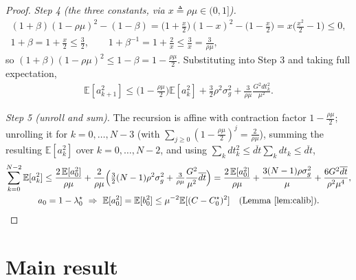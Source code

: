 \documentclass[11pt]{article}
\newcommand{\E}{\mathbb{E}}
\theoremstyle{plain}
\theoremstyle{definition}
\theoremstyle{remark}
\begin{document}
\begin{proof}
\emph{Step 4 (the three constants, via $x\triangleq\rho\mu\in(0,1]$).}
\begin{gather*}
(1+\beta)(1-\rho\mu)^2-(1-\beta)=\big(1+\tfrac x2\big)(1-x)^2-\big(1-\tfrac x2\big)=x\big(\tfrac{x^2}{2}-1\big)\le0,\\
1+\beta=1+\tfrac x2\le\tfrac32,\qquad 1+\beta^{-1}=1+\tfrac2x\le\tfrac3x=\tfrac{3}{\rho\mu},
\end{gather*}
so $(1+\beta)(1-\rho\mu)^2\le1-\beta=1-\tfrac{\rho\mu}{2}$. Substituting into Step 3 and taking full expectation,
\begin{gather*}
\E[a_{k+1}^2]\le\big(1-\tfrac{\rho\mu}{2}\big)\E[a_k^2]+\tfrac32\rho^2\sigma_g^2+\tfrac{3}{\rho\mu}\frac{G^2dt_k^2}{\mu^2}.
\end{gather*}

\emph{Step 5 (unroll and sum).} The recursion is affine with contraction factor $1-\tfrac{\rho\mu}{2}$;
unrolling it for $k=0,\dots,N-3$ (with $\sum_{j\ge0}(1-\tfrac{\rho\mu}{2})^j=\tfrac{2}{\rho\mu}$), summing the
resulting $\E[a_k^2]$ over $k=0,\dots,N-2$, and using
$\sum_k dt_k^2\le\overline{dt}\sum_k dt_k\le\overline{dt}$,
\begin{gather*}
\sum_{k=0}^{N-2}\E[a_k^2]\le\frac{2\,\E[a_0^2]}{\rho\mu}
+\frac{2}{\rho\mu}\Big(\tfrac32(N-1)\rho^2\sigma_g^2+\tfrac{3}{\rho\mu}\frac{G^2}{\mu^2}\overline{dt}\Big)
=\frac{2\,\E[a_0^2]}{\rho\mu}+\frac{3(N-1)\rho\sigma_g^2}{\mu}+\frac{6G^2\overline{dt}}{\rho^2\mu^4},\\
a_0=1-\lambda^\star_0\ \Rightarrow\ \E[a_0^2]=\E[b_0^2]\le\mu^{-2}\E[(C-C^\star_0)^2]\quad(\text{Lemma~\ref{lem:calib}}).
\end{gather*}
\end{proof}

\section{Main result}
\label{sec:main}
\end{document}
